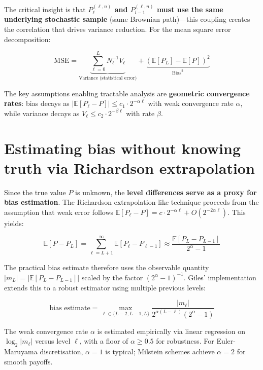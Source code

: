 \documentclass[11pt,a4paper]{article}
\begin{document}
\noindent The critical insight is that \textbf{$P_\ell^{(\ell,n)}$ and $P_{l-1}^{(\ell,n)}$ must use the same underlying stochastic sample} (same Brownian path)---this coupling creates the correlation that drives variance reduction. For the mean square error decomposition:

\begin{equation}
\text{MSE} = \underbrace{\sum_{\ell=0}^{L} N_\ell^{-1} V_\ell}_{\text{Variance (statistical error)}} + \underbrace{(\mathbb{E}[P_L] - \mathbb{E}[P])^2}_{\text{Bias}^2}
\end{equation}

\noindent The key assumptions enabling tractable analysis are \textbf{geometric convergence rates}: bias decays as $|\mathbb{E}[P_\ell - P]| \leq c_1 \cdot 2^{-\alpha\ell}$ with weak convergence rate $\alpha$, while variance decays as $V_\ell \leq c_2 \cdot 2^{-\beta\ell}$ with rate $\beta$.

\section{Estimating bias without knowing truth via Richardson extrapolation}

Since the true value $P$ is unknown, the \textbf{level differences serve as a proxy for bias estimation}. The Richardson extrapolation-like technique proceeds from the assumption that weak error follows $\mathbb{E}[P_\ell - P] = c \cdot 2^{-\alpha\ell} + O(2^{-2\alpha\ell})$. This yields:

\begin{equation}
\mathbb{E}[P - P_L] = \sum_{\ell=L+1}^{\infty} \mathbb{E}[P_\ell - P_{\ell-1}] \approx \frac{\mathbb{E}[P_L - P_{L-1}]}{2^\alpha - 1}
\end{equation}

\noindent The practical bias estimate therefore uses the observable quantity $|m_L| = |\mathbb{E}[P_L - P_{L-1}]|$ scaled by the factor $(2^\alpha - 1)^{-1}$. Giles' implementation extends this to a robust estimator using multiple previous levels:

\begin{equation}
\text{bias estimate} = \max_{\ell \in \{L-2, L-1, L\}} \frac{|m_\ell|}{2^{\alpha(L-\ell)}(2^\alpha - 1)}
\end{equation}

\noindent The weak convergence rate $\alpha$ is estimated empirically via linear regression on $\log_2|m_\ell|$ versus level $\ell$, with a floor of $\alpha \geq 0.5$ for robustness. For Euler-Maruyama discretisation, $\alpha = 1$ is typical; Milstein schemes achieve $\alpha = 2$ for smooth payoffs.
\end{document}

